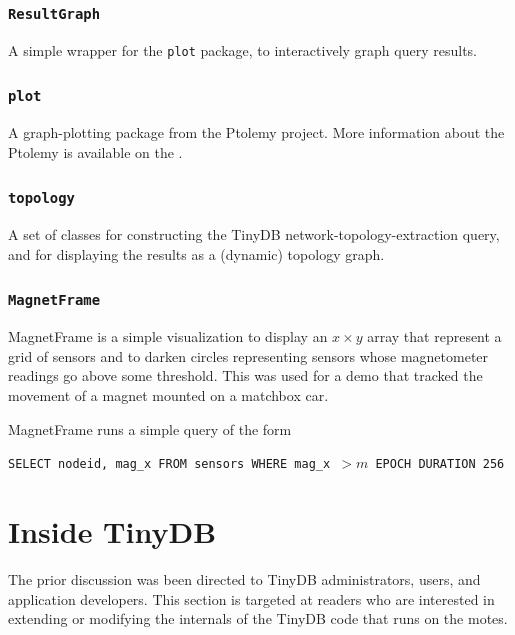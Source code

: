 \documentclass[11pt]{article}
\begin{document}
\subsubsection{\tt ResultGraph} 
\label{sec:resultgraph}
A simple wrapper for the {\tt plot} package, to
  interactively graph query results.

\subsubsection{\tt plot}
\label{sec:plot}
A graph-plotting package from the Ptolemy project.  More information about the Ptolemy is available on the .

\subsubsection{\tt topology}
\label{sec:topology}
A set of classes for constructing the TinyDB
  network-topology-extraction query, and for displaying the results as
  a (dynamic) topology graph.

\subsubsection{\tt MagnetFrame}
\label{sec:magnetframe}
MagnetFrame is a simple visualization to
    display an $x \times y$ array that represent a grid of sensors and
    to darken circles representing sensors whose magnetometer readings
    go above some threshold.  This was used for a demo that tracked
    the movement of a magnet mounted on a matchbox car.
    
    MagnetFrame runs a simple query of the form
    
    {\tt SELECT nodeid, mag\_x FROM sensors WHERE mag\_x $> m$
    EPOCH DURATION 256}


\section{Inside TinyDB} \label{sec:inside}
The prior discussion was been directed to TinyDB administrators,
users, and application developers.  This section is targeted at
readers who are interested in extending or modifying the internals of
the TinyDB code that runs on the motes.
\end{document}
